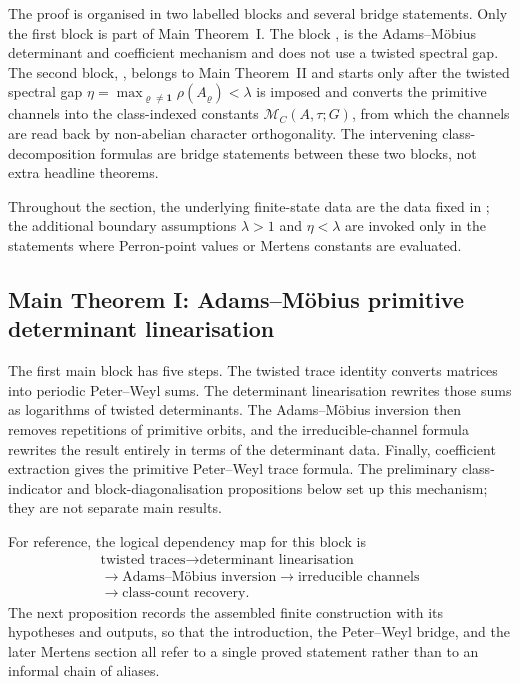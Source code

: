 \documentclass[11pt,a4paper]{amsart}
\theoremstyle{plain}
\theoremstyle{definition}
\theoremstyle{remark}
\begin{document}
The proof is organised in two labelled blocks and several bridge
statements.  Only the first block is part of Main Theorem~I. The block
,
is the Adams--M\"obius determinant and coefficient
mechanism and does not use a twisted spectral gap. The second block,
, belongs to Main Theorem~II and starts only
after the twisted spectral gap
\(\eta=\max_{\varrho\neq\mathbf 1}\rho(A_\varrho)<\lambda\) is imposed
and converts the primitive channels into the class-indexed constants
\(\mathcal M_C(A,\tau;G)\), from which the channels are read back by
non-abelian character orthogonality. The
intervening class-decomposition formulas are bridge statements between
these two blocks, not extra headline theorems.

Throughout the section, the underlying finite-state data are the data
fixed in ; the additional boundary
assumptions \(\lambda>1\) and \(\eta<\lambda\) are invoked only in the
statements where Perron-point values or Mertens constants are evaluated.

\subsection{Main Theorem I: Adams--M\"obius primitive determinant
linearisation}

The first main block has five steps. The twisted trace identity converts
matrices into periodic Peter--Weyl sums. The determinant linearisation
rewrites those sums as logarithms of twisted determinants. The
Adams--M\"obius inversion then removes repetitions of primitive orbits,
and the irreducible-channel formula rewrites the result entirely in
terms of the determinant data. Finally, coefficient extraction gives the
primitive Peter--Weyl trace formula. The preliminary class-indicator and
block-diagonalisation propositions below set up this mechanism; they
are not separate main results.

For reference, the logical dependency map for this block is
\[
\begin{array}{c}
  \text{twisted traces}\to\text{determinant linearisation}\\[2pt]
  \to\text{Adams--M\"obius inversion}\to\text{irreducible channels}\\[2pt]
  \to\text{class-count recovery}.
\end{array}
\]
The next proposition records the assembled finite construction with its
hypotheses and outputs, so that the introduction, the Peter--Weyl bridge, and
the later Mertens section all refer to a single proved statement rather than to
an informal chain of aliases.
\end{document}
